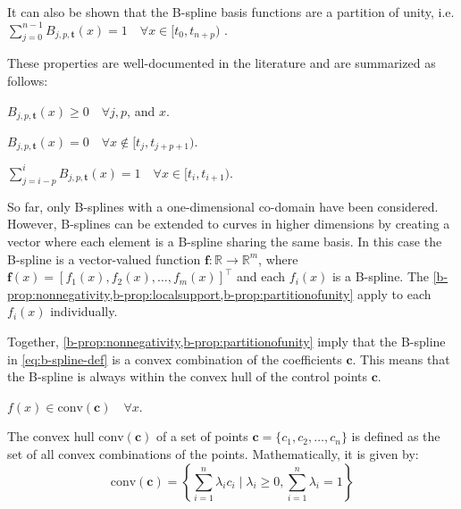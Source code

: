 It can also be shown that the B-spline basis functions are a partition of unity, i.e. $\sum_{j=0}^{n-1} B_{j, p, \mathbf{t}}(x) = 1 \quad\forall x \in [t_0, t_{n+p})$ \citep{deBoor1978practicalguide}.

These properties are well-documented in the literature and are summarized as follows:
\begin{property}[Nonnegativity]\label{b-prop:nonnegativity}
    $B_{j, p, \mathbf{t}}(x) \geq 0 \quad\forall j, p$, and $x$.
\end{property}

\begin{property}\label{b-prop:localsupport}
    $B_{j, p, \mathbf{t}}(x)=0 \quad\forall x \notin [t_j, t_{j+p+1})$.
\end{property}

\begin{property}\label{b-prop:partitionofunity}
    $\sum_{j=i-p}^i B_{j, p, \mathbf{t}}(x)=1 \quad\forall x \in [t_i, t_{i+1})$.
\end{property}
So far, only B-splines with a one-dimensional co-domain have been considered. However, B-splines can be extended to curves in higher dimensions by creating a vector where each element is a B-spline sharing the same basis. In this case the B-spline is a vector-valued function $\mathbf{f}: \mathbb R \rightarrow \mathbb R^m$, where $\mathbf{f}(x) = [f_1(x), f_2(x), \dots, f_m(x)]^\top$ and each $f_i(x)$ is a B-spline. The \cref{b-prop:nonnegativity,b-prop:localsupport,b-prop:partitionofunity} apply to each $f_i(x)$ individually.



Together, \cref{b-prop:nonnegativity,b-prop:partitionofunity} imply that the B-spline in \cref{eq:b-spline-def} is a convex combination of the coefficients $\mathbf c$. This means that the B-spline is always within the convex hull of the control points $\mathbf c$.

\begin{property}\label{b-prop:convexhull}
    $f(x) \in \text{conv}(\mathbf{c})
    \quad\forall x$.
\end{property}

The convex hull $\text{conv}(\mathbf{c})$ of a set of points $\mathbf{c} = \{c_1, c_2, \ldots, c_n\}$ is defined as the set of all convex combinations of the points. Mathematically, it is given by:
\begin{equation}
    \text{conv}(\mathbf{c}) = \left\{ \sum_{i=1}^n \lambda_i c_i \mid \lambda_i \geq 0, \sum_{i=1}^n \lambda_i = 1 \right\}
\end{equation}

